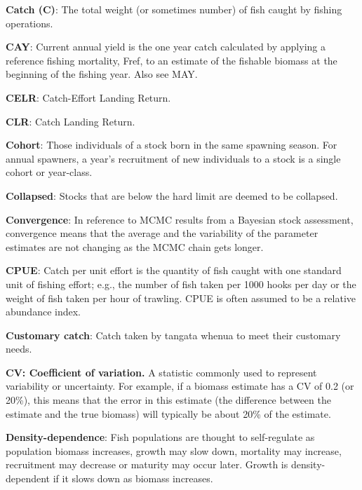 \documentclass{mpi-plenary}
\theoremstyle{definition}
\theoremstyle{definition}
\theoremstyle{definition}
\theoremstyle{remark}
\begin{document}
\protect\hypertarget{def-catch}{}{} \textbf{Catch (C)}: The total weight
(or sometimes number) of fish caught by fishing operations.

\protect\hypertarget{def-cay}{}{} \textbf{CAY}: Current annual yield is
the one year catch calculated by applying a reference fishing mortality,
Fref, to an estimate of the fishable biomass at the beginning of the
fishing year. Also see MAY.

\protect\hypertarget{def-celr}{}{} \textbf{CELR}: Catch-Effort Landing
Return.

\protect\hypertarget{def-clr}{}{} \textbf{CLR}: Catch Landing Return.

\protect\hypertarget{def-cohort}{}{} \textbf{Cohort}: Those individuals
of a stock born in the same spawning season. For annual spawners, a
year's recruitment of new individuals to a stock is a single cohort or
year-class.

\protect\hypertarget{def-collapsed}{}{} \textbf{Collapsed}: Stocks that
are below the hard limit are deemed to be collapsed.

\protect\hypertarget{def-convergence}{}{} \textbf{Convergence}: In
reference to MCMC results from a Bayesian stock assessment, convergence
means that the average and the variability of the parameter estimates
are not changing as the MCMC chain gets longer.

\protect\hypertarget{def-cpue}{}{} \textbf{CPUE}: Catch per unit effort
is the quantity of fish caught with one standard unit of fishing effort;
e.g., the number of fish taken per 1000 hooks per day or the weight of
fish taken per hour of trawling. CPUE is often assumed to be a relative
abundance index.

\protect\hypertarget{def-customary-catch}{}{} \textbf{Customary catch}:
Catch taken by tangata whenua to meet their customary needs.

\protect\hypertarget{def-cv}{}{} \textbf{CV: Coefficient of variation.}
A statistic commonly used to represent variability or uncertainty. For
example, if a biomass estimate has a CV of 0.2 (or 20\%), this means
that the error in this estimate (the difference between the estimate and
the true biomass) will typically be about 20\% of the estimate.

\protect\hypertarget{def-density-dependence}{}{}
\textbf{Density-dependence}: Fish populations are thought to
self-regulate as population biomass increases, growth may slow down,
mortality may increase, recruitment may decrease or maturity may occur
later. Growth is density-dependent if it slows down as biomass
increases.
\end{document}
